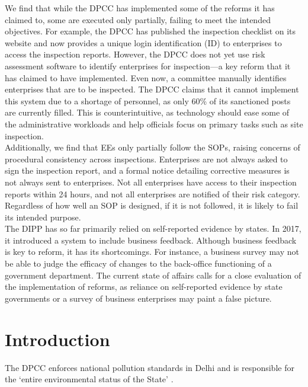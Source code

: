 \documentclass[a4paper, 12pt, twoside]{article}
\begin{document}
                 We find that while the DPCC has implemented some of the reforms it has claimed to, some are executed only partially, failing to meet the intended objectives. For example, the DPCC has published the inspection checklist on its website and now provides a unique login identification (ID) to enterprises to access the inspection reports. However, the DPCC does not yet use risk assessment software to identify enterprises for inspection—a key reform that it has claimed to have implemented. Even now, a committee manually identifies enterprises that are to be inspected. The DPCC claims that it cannot implement this system due to a shortage of personnel, as only 60\% of its sanctioned posts are currently filled. This is counterintuitive, as technology should ease some of the administrative workloads and help officials focus on primary tasks such as site inspection. \\
                 
                 Additionally, we find that EEs only partially follow the SOPs, raising concerns of procedural consistency across inspections. Enterprises are not always asked to sign the inspection report, and a formal notice detailing corrective measures is not always sent to enterprises. Not all enterprises have access to their inspection reports within 24 hours, and not all enterprises are notified of their risk category. Regardless of how well an SOP is designed, if it is not followed, it is likely to fail its intended purpose. \\
                 
                  The DIPP has so far primarily relied on self-reported evidence by states. In 2017, it introduced a system to include business feedback. Although business feedback is key to reform, it has its shortcomings. For instance, a business survey may not be able to judge the efficacy of changes to the back-office functioning of a government department. The current state of affairs calls for a close evaluation of the implementation of reforms, as reliance on self-reported evidence by state governments or a survey of business enterprises may paint a false picture. 
                  
                    \newpage
                    \section{Introduction}
                    
                 The DPCC enforces national pollution standards in Delhi and is responsible for the ‘entire environmental status of the State’ \parencite{NGT}. \\
                 
\end{document}
